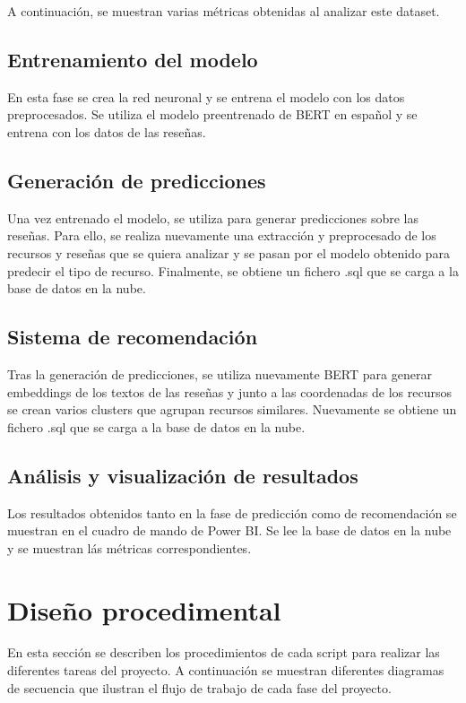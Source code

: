 A continuación, se muestran varias métricas obtenidas al analizar este dataset.


\subsection{Entrenamiento del modelo}

En esta fase se crea la red neuronal y se entrena el modelo con los datos preprocesados. 
Se utiliza el modelo preentrenado de BERT en español y se entrena con los datos de las reseñas.

\subsection{Generación de predicciones}

Una vez entrenado el modelo, se utiliza para generar predicciones sobre las reseñas.
Para ello, se realiza nuevamente una extracción y preprocesado de los recursos y reseñas que se quiera analizar y se pasan por el modelo obtenido para predecir el tipo de recurso.
Finalmente, se obtiene un fichero .sql que se carga a la base de datos en la nube.

\subsection{Sistema de recomendación}

Tras la generación de predicciones, se utiliza nuevamente BERT para generar embeddings de los textos de las reseñas y junto a las coordenadas de los recursos se 
crean varios clusters que agrupan recursos similares.
Nuevamente se obtiene un fichero .sql que se carga a la base de datos en la nube.

\subsection{Análisis y visualización de resultados}

Los resultados obtenidos tanto en la fase de predicción como de recomendación se muestran en el cuadro de mando de Power BI.
Se lee la base de datos en la nube y se muestran lás métricas correspondientes.

\section{Diseño procedimental}

En esta sección se describen los procedimientos de cada script para realizar las diferentes tareas del proyecto.
A continuación se muestran diferentes diagramas de secuencia que ilustran el flujo de trabajo de cada fase del proyecto.

